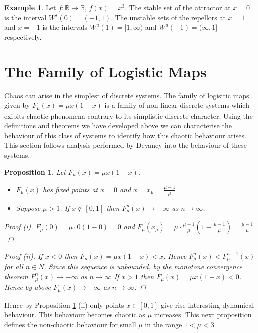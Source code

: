 \documentclass[11pt,a4paper,oneside]{memoir}
\theoremstyle{plain}
\newtheorem{prop}[thm]{Proposition}
\theoremstyle{definition}
\newtheorem{exmp}[thm]{Example}
\begin{document}
\begin{exmp}
    Let $f: \mathbb{R} \to \mathbb{R}$, $f(x) = x^3$. The stable set of the attractor at $x = 0$ is the interval $W^s(0) = (-1, 1)$. The unstable sets of the repellors at $x = 1$ and $x = -1$ is the intervals $W^u(1) = [1, \infty)$ and $W^u(-1) = (\infty, 1]$ respectively.
\end{exmp}

\section{The Family of Logistic Maps} \label{sec:logistic_maps}
Chaos can arise in the simplest of discrete systems. The family of logisitic maps given by $F_\mu(x) = \mu x(1-x)$ is a family of non-linear discrete systems which exibits chaotic phenomena contrary to its simplistic discrete character. Using the definitions and theorems we have developed above we can characterise the behaviour of this class of systems to identify how this chaotic behaviour arises. This section follows analysis performed by Devaney \cite[Section 1.5]{devaney} into the behaviour of these systems.

\begin{prop} Let $F_\mu(x) = \mu x(1-x)$. \label{prop:logistic1}
    \begin{itemize}
        \item[(i)] $F_\mu(x)$ has fixed points at $x = 0$ and $x = x_{\mu} = \frac{\mu - 1}{\mu}$
        \item[(ii)] Suppose $\mu > 1$. If $x \notin [0, 1]$ then $F_\mu^n(x) \to - \infty$ as $n \to \infty$.
    \end{itemize}
    \begin{proof}[Proof (i)]
        $F_{\mu}(0) = \mu \cdot 0(1 - 0) = 0$ and $F_{\mu}(x_\mu) = \mu \cdot \frac{\mu - 1}{\mu} \left(1 - \frac{\mu - 1}{\mu}\right) = \frac{\mu - 1}{\mu}$ 
    \end{proof}
    \begin{proof}[Proof (ii)]
        If $x < 0$ then $F_\mu(x) = \mu x(1-x) < x$. Hence $F_\mu^n(x) < F_\mu^{n-1}(x)$ for all $n \in N$. Since this sequence is unbounded, by the monotone convergence theorem $F_\mu^n(x) \to - \infty$ as $n \to \infty$ If $x > 1$ then $F_\mu(x) = \mu x (1-x) < 0$. Hence by above $F_\mu(x) \to - \infty$ as $n \to \infty$.
    \end{proof}
\end{prop}
Hence by Proposition \ref{prop:logistic1} (ii) only points $x \in [0, 1]$ give rise interesting dynamical behaviour. This behaviour becomes chaotic as $\mu $ increases. This next proposition defines the non-chaotic behaviour for small $\mu$ in the range $1 < \mu < 3$.
\end{document}
